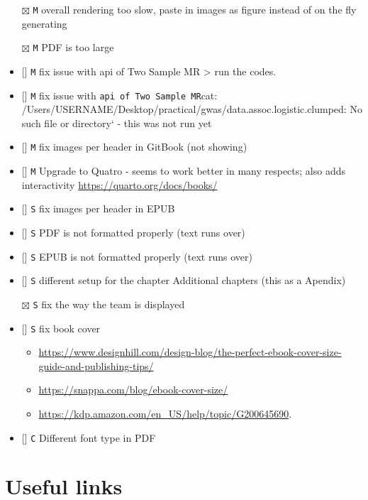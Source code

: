 \documentclass[
]{book}
\newcommand{\passthrough}[1]{#1}
\providecommand{\tightlist}{%
  \setlength{\itemsep}{0pt}\setlength{\parskip}{0pt}}
\begin{document}
\begin{itemize}
\item[$\boxtimes$]
  \passthrough{\lstinline!M!} overall rendering too slow, paste in images as figure instead of on the fly generating
\item[$\boxtimes$]
  \passthrough{\lstinline!M!} PDF is too large
\item
  {[}{]} \passthrough{\lstinline!M!} fix issue with api of Two Sample MR \textgreater{} run the codes.
\item
  {[}{]} \passthrough{\lstinline!M!} fix issue with \passthrough{\lstinline!api of Two Sample MR!}cat: /Users/USERNAME/Desktop/practical/gwas/data.assoc.logistic.clumped: No such file or directory` - this was not run yet
\item
  {[}{]} \passthrough{\lstinline!M!} fix images per header in GitBook (not showing)
\item
  {[}{]} \passthrough{\lstinline!M!} Upgrade to Quatro - seems to work better in many respects; also adds interactivity \url{https://quarto.org/docs/books/}
\item
  {[}{]} \passthrough{\lstinline!S!} fix images per header in EPUB
\item
  {[}{]} \passthrough{\lstinline!S!} PDF is not formatted properly (text runs over)
\item
  {[}{]} \passthrough{\lstinline!S!} EPUB is not formatted properly (text runs over)
\item
  {[}{]} \passthrough{\lstinline!S!} different setup for the chapter Additional chapters (this as a Apendix)
\item[$\boxtimes$]
  \passthrough{\lstinline!S!} fix the way the team is displayed
\item
  {[}{]} \passthrough{\lstinline!S!} fix book cover

  \begin{itemize}
  \tightlist
  \item
    \url{https://www.designhill.com/design-blog/the-perfect-ebook-cover-size-guide-and-publishing-tips/}
  \item
    \url{https://snappa.com/blog/ebook-cover-size/}
  \item
    \url{https://kdp.amazon.com/en_US/help/topic/G200645690}.
  \end{itemize}
\item
  {[}{]} \passthrough{\lstinline!C!} Different font type in PDF
\end{itemize}

\hypertarget{useful-links}{%
\section{Useful links}\label{useful-links}}
\end{document}

